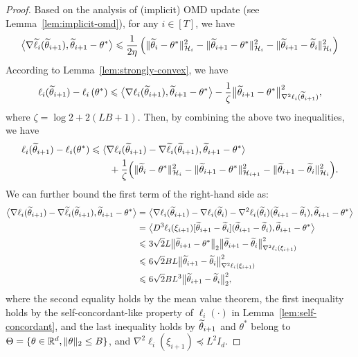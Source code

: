 \begin{proof}
    Based on the analysis of (implicit) OMD update (see Lemma~\ref{lem:implicit-omd}), for any $i \in [T]$, we have
    \begin{align*}
        \big\langle\nabla \widetilde{\ell}_{i} (\widetilde{\theta}_{i+1}), \widetilde{\theta}_{i+1}-\theta^*\big\rangle \leqslant \frac{1}{2 \eta}\left(\|\widetilde{\theta}_{i}-\theta^*\|_{\mathcal{H}_{i}}^2-\|\widetilde{\theta}_{i+1}-\theta^*\|_{\mathcal{H}_{i}}^2-\|\widetilde{\theta}_{i+1}-\widetilde{\theta}_{i}\|_{\mathcal{H}_i}^2\right)
    \end{align*} 
    According to Lemma~\ref{lem:strongly-convex}, we have
    \begin{align*}
        \ell_i(\widetilde{\theta}_{i+1})-\ell_i\left(\theta^*\right) \leqslant\big\langle\nabla \ell_i(\widetilde{\theta}_{i+1}), \widetilde{\theta}_{i+1}-\theta^*\big\rangle-\frac{1}{\zeta}\big\|\widetilde{\theta}_{i+1}-\theta^*\big\|_{\nabla^2 \ell_i(\widetilde{\theta}_{i+1})}^2,
    \end{align*}  
    where $\zeta=\log 2+2(LB+1)$. Then, by combining the above two inequalities, we have
    \begin{align*}
        \ell_i(\widetilde{\theta}_{i+1})-\ell_i(\theta^*) & \leqslant\langle\nabla \ell_i(\widetilde{\theta}_{i+1})-\nabla \widetilde{\ell}_i(\widetilde{\theta}_{i+1}), \widetilde{\theta}_{i+1}-\theta^*\rangle  \\
        &\qquad +\frac{1}{\zeta} \Big(\|\widetilde{\theta}_i-\theta^*\|_{\mathcal{H}_i}^2-\|\widetilde{\theta}_{i+1}-\theta^*\|_{\mathcal{H}_{i+1}}^2-\|\widetilde{\theta}_{i+1}-\widetilde{\theta}_i\|_{\mathcal{H}_i}^2 \Big).
    \end{align*}
    We can further bound the first term of the right-hand side as:
    \begin{align*}
         \big \langle\nabla \ell_i(\thetat_{i+1})-\nabla \tilde{\ell}_i(\thetat_{i+1}), \thetat_{i+1}-\theta^*\big\rangle = \ &\big \langle\nabla \ell_i(\thetat_{i+1})-\nabla \ell_i(\thetat_i)-\nabla^2 \ell_i(\thetat_i)(\thetat_{i+1}-\thetat_i), \thetat_{i+1}-\theta^*\big\rangle \\
        = \ & \big \langle D^3 \ell_i({\xi}_{i+1})[\thetat_{i+1}-\thetat_i](\thetat_{i+1}-\thetat_i), \thetat_{i+1}-\theta^*\big\rangle \\
        \leqslant \ & 3\sqrt{2} L\big \|\thetat_{i+1}-\theta^*\big\|_2 \big \|\thetat_{i+1}-\thetat_i\big\|_{\nabla^2 \ell_i({\xi}_{i+1})}^2 \\
        \leqslant \ & 6\sqrt{2} BL \big \|\thetat_{i+1}-\thetat_i\big\|_{\nabla^2 \ell_i({\xi}_{i+1})}^2 \\
        \leqslant \ & 6\sqrt{2} BL^3 \big \|\thetat_{i+1}-\thetat_i\big\|_2^2,
    \end{align*}
    where the second equality holds by the mean value theorem, the first inequality holds by the self-concordant-like property of $\ell_i(\cdot)$ in Lemma~\ref{lem:self-concordant}, and the last inequality holds by $\widetilde{\theta}_{i+1}$ and $\theta^*$ belong to $\Theta = \{\theta \in \mathbb{R}^d, \lVert\theta\rVert_2 \leq B\}$, and ${\nabla^2 \ell_i({\xi}_{i+1})} \preceq L^2 I_d$.


\end{proof}
